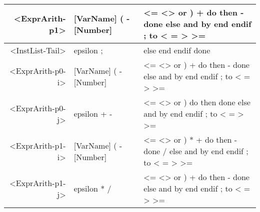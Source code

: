 \begin{longtable}{r p{7cm} p{7cm}}
<ExprArith-p1> & [VarName] ( - [Number]  & <= <> or ) + do then - done else and by end endif ; to < = > >= \\ \hline
<InstList-Tail> & epsilon ;  & else end endif done \\ \hline
<ExprArith-p0-i> & [VarName] ( - [Number]  & <= <> or ) + do then - done else and by end endif ; to < = > >= \\ \hline
<ExprArith-p0-j> & epsilon + -  & <= <> or ) do then done else and by end endif ; to < = > >= \\ \hline
<ExprArith-p1-i> & [VarName] ( - [Number]  & <= <> or ) * + do then - done / else and by end endif ; to < = > >= \\ \hline
<ExprArith-p1-j> & epsilon * /  & <= <> or ) + do then - done else and by end endif ; to < = > >= 
\end{longtable}

